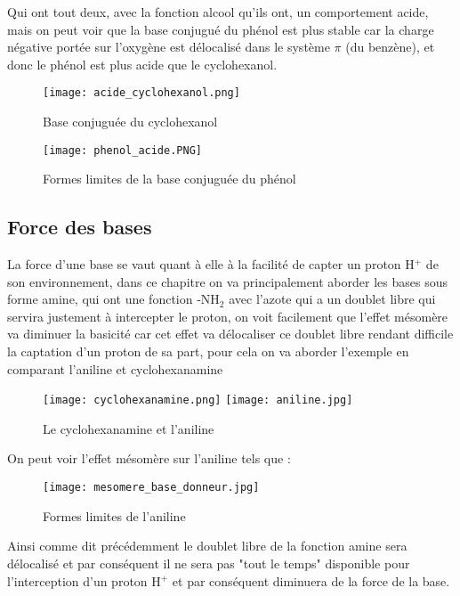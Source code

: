 \documentclass[a4paper, oneside]{book}
\begin{document}
Qui ont tout deux, avec la fonction alcool qu'ils ont, un comportement acide, mais on peut voir que la base conjugué du phénol est plus stable car la charge négative portée sur l'oxygène est délocalisé dans le système $\pi$ (du benzène), et donc le phénol est plus acide que le cyclohexanol.
\begin{figure}[!h]
    \centering
    \texttt{[image: acide\_cyclohexanol.png]}
    \caption{Base conjuguée du cyclohexanol}
    \label{fig:my_label}
\end{figure}
\begin{figure}[!h]
    \centering
    \texttt{[image: phenol\_acide.PNG]}
    \caption{Formes limites de la base conjuguée du phénol}
    \label{fig:my_label}
\end{figure}
\subsection{Force des bases}
La force d'une base se vaut quant à elle à la facilité de capter un proton H$^+$ de son environnement, dans ce chapitre on va principalement aborder les bases sous forme amine, qui ont une fonction -NH$_2$ avec l'azote qui a un doublet libre qui servira justement à intercepter le proton, on voit facilement que l'effet mésomère va diminuer la basicité car cet effet va délocaliser ce doublet libre rendant difficile la captation d'un proton de sa part, pour cela on va aborder l'exemple en comparant l'aniline et cyclohexanamine
\begin{figure}[!h]
    \centering
    \texttt{[image: cyclohexanamine.png]}
    \texttt{[image: aniline.jpg]}
    \caption{Le cyclohexanamine et l'aniline}
    \label{fig:my_label}
\end{figure}
\newpage
On peut voir l'effet mésomère sur l'aniline tels que :
\begin{figure}[!h]
    \centering
    \texttt{[image: mesomere\_base\_donneur.jpg]}
    \caption{Formes limites de l'aniline}
    \label{fig:my_label}
\end{figure}

Ainsi comme dit précédemment le doublet libre de la fonction amine sera délocalisé et par conséquent il ne sera pas "tout le temps" disponible pour l'interception d'un proton H$^+$ et par conséquent diminuera de la force de la base.
\end{document}
